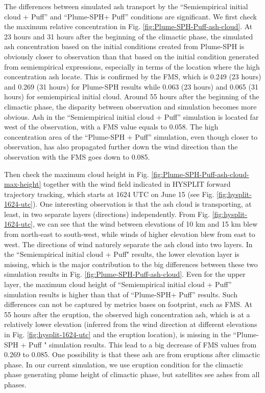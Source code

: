 \documentclass[utf8]{frontiersSCNS} %
\begin{document}
The differences between simulated ash transport by the ``Semiempirical initial cloud + Puff'' and ``Plume-SPH+ Puff'' conditions are significant. We first check the maximum relative concentration in Fig. \ref{fig:Plume-SPH-Puff-ash-cloud}. At 23 hours and 31 hours after the beginning of the climactic phase, the simulated ash concentration based on the initial conditions created from Plume-SPH is obviously closer to observation than that based on the initial condition generated from semiempirical expressions, especially in terms of the location where  the high concentration ash locate. This is confirmed by the FMS, which is 0.249 (23 hours) and 0.269 (31 hours) for Plume-SPH results while 0.063 (23 hours) and 0.065 (31 hours) for semiempirical initial cloud. Around 55 hours after the beginning of the climactic phase, the disparity between observation and simulation becomes more obvious. Ash in the ``Semiempirical initial cloud + Puff'' simulation is located far west of the observation, with a FMS value equals to 0.058. The high concentration area of the ``Plume-SPH + Puff'' simulation, even though closer to observation, has also propagated further down the wind direction than the observation with the FMS goes down to 0.085.

Then check the maximum cloud height in Fig. \ref{fig:Plume-SPH-Puff-ash-cloud-max-height} together with the wind field indicated in HYSPLIT forward trajectory tracking, which starts at 1624 UTC on June 15  (see Fig. \ref{fig:hysplit-1624-utc}). One interesting observation is that the ash cloud is transporting, at least, in two separate layers (directions) independently. From Fig. \ref{fig:hysplit-1624-utc}, we can see that the wind between elevations of 10 km and 15 km blew from north-east to south-west, while winds of higher elevation blew from east to west. The directions of wind naturely separate the ash cloud into two layers.  In the ``Semiempirical initial cloud + Puff" results, the lower elevation layer is missing, which is the major contribution to the big differences between these two simulation results  in Fig. \ref{fig:Plume-SPH-Puff-ash-cloud}. Even for the upper layer, the maximum cloud height of  ``Semiempirical initial cloud + Puff'' simulation results is higher than that of ``Plume-SPH+ Puff'' results. Such differences can not be captured by metrics bases on footprint, such as FMS.  At 55 hours after the eruption, the observed high concentration ash, which is at a relatively lower elevation (inferred from the wind direction at different elevations in Fig. \ref{fig:hysplit-1624-utc} and the eruption location), is missing in the ``Plume-SPH + Puff " simulation results. This lead to a big decrease of FMS values from 0.269 to 0.085. One possibility is that these ash are from eruptions after climactic phase. In our current simulation, we use eruption condition for the climactic phase generating plume height of climactic phase, but satellites see ashes from all phases. 
\end{document}
